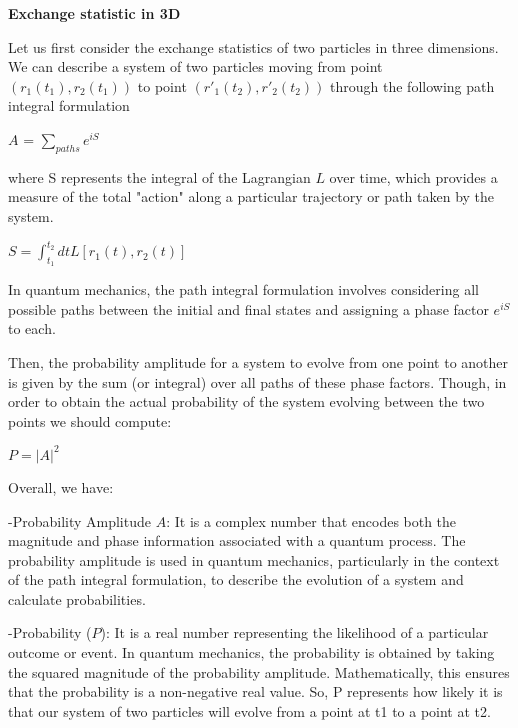 \documentclass[12pt]{report}
\begin{document}
	\begin{minipage}{1 \textwidth}
		\textbf{Exchange statistic in 3D }\newline
		
		Let us first consider the exchange statistics of two particles in three dimensions.  We can describe a system of two particles moving from point $(r_1(t_1),r_2(t_1))$ to point $(r'_1(t_2),r'_2(t_2))$ through the following path integral formulation 
		
		\begin{center}
			$A$ = $\sum_{paths} e^{iS}$
		\end{center}
		
		where S represents the integral of the Lagrangian $L$ over time, which provides a measure of the total "action" along a particular trajectory or path taken by the system. 
		
		\begin{center}
			$S = \int_{t_1}^{t_2}dt \textit{L} [ r_1(t),r_2(t) ] $
		\end{center}
		
		In quantum mechanics, the path integral formulation involves considering all possible paths between the initial and final states and assigning a phase factor $e^{iS}$ to each.\newline
		
		Then, the probability amplitude for a system to evolve from one point to another is given by the sum (or integral) over all paths of these phase factors. Though, in order to obtain the actual probability of the system evolving between the two points we should compute:
		
		\begin{center}
			$P= |A|^2 $
		\end{center}
		
		Overall, we have:\newline
		
		-Probability Amplitude $A$: It is a complex number that encodes both the magnitude and phase information associated with a quantum process. The probability amplitude is used in quantum mechanics, particularly in the context of the path integral formulation, to describe the evolution of a system and calculate probabilities.\newline
		
		-Probability ($P$): It is a real number representing the likelihood of a particular outcome or event. In quantum mechanics, the probability is obtained by taking the squared magnitude of the probability amplitude. Mathematically, this ensures that the probability is a non-negative real value. So, P represents how likely it is that our system of two particles will evolve from a point at t1 to a point at t2.\newline
		

\end{minipage}
\end{document}
